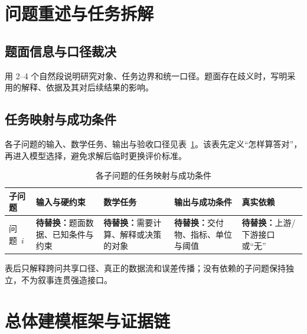 
\section{问题重述与任务拆解}

\subsection{题面信息与口径裁决}

用 2--4 个自然段说明研究对象、任务边界和统一口径。题面存在歧义时，写明采用的解释、依据及其对后续结果的影响。

\subsection{任务映射与成功条件}

各子问题的输入、数学任务、输出与验收口径见表~\ref{tab:task-map}。该表先定义“怎样算答对”，再进入模型选择，避免求解后临时更换评价标准。

\begin{table}[htbp]
  \centering
  \caption{各子问题的任务映射与成功条件}
  \label{tab:task-map}
  \begin{tabularx}{\textwidth}{>{\centering\arraybackslash}p{}XXXX}
    \toprule
    子问题 & 输入与硬约束 & 数学任务 & 输出与成功条件 & 真实依赖 \\
    \midrule
    问题~$i$ & \textbf{待替换：}题面数据、已知条件与约束 & \textbf{待替换：}需要计算、解释或决策的对象 & \textbf{待替换：}交付物、指标、单位与阈值 & \textbf{待替换：}上游/下游接口或“无” \\
    \bottomrule
  \end{tabularx}
\end{table}

表后只解释跨问共享口径、真正的数据流和误差传播；没有依赖的子问题保持独立，不为叙事连贯强造接口。

\section{总体建模框架与证据链}

